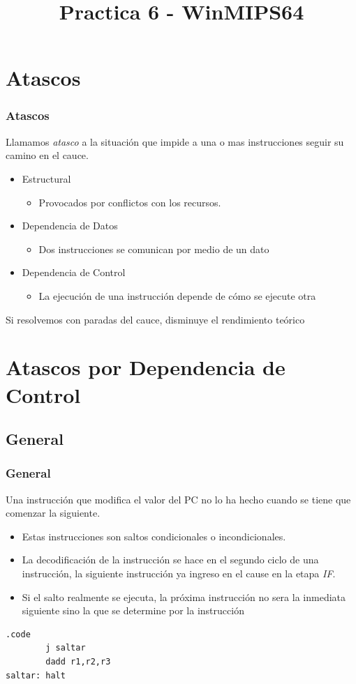 \documentclass{beamer}
\title{Practica 6 - WinMIPS64}
\begin{document}
\section{Atascos}


\begin{frame}
\frametitle{Atascos}
Llamamos \emph{atasco} a la situación que impide a una o mas instrucciones seguir su camino en el cauce.

\begin{itemize}
\item Estructural
\begin{itemize}
\item Provocados por conflictos con los recursos.
\end{itemize}


\item Dependencia de Datos
\begin{itemize}
\item Dos instrucciones se comunican por medio de un dato
\end{itemize}

\item Dependencia de Control
\begin{itemize}
\item La ejecución de una instrucción depende de cómo se ejecute otra
\end{itemize}

\end{itemize}
Si resolvemos con paradas del cauce, disminuye el rendimiento teórico
\end{frame}



\section{Atascos por Dependencia de Control}
\subsection{General}
\begin{frame}[fragile]
\frametitle{General}
Una instrucción que modifica el valor del PC no lo ha hecho cuando se tiene que comenzar la siguiente.
\begin{itemize}
\item Estas instrucciones son saltos condicionales o incondicionales.
\item La decodificación de la instrucción se hace en el segundo ciclo de una instrucción, la siguiente instrucción ya ingreso en el cause en la etapa \emph{IF}.
\item Si el salto realmente se ejecuta, la próxima instrucción no sera la inmediata siguiente sino la que se determine por la instrucción
\end{itemize}
\begin{block}{}
\begin{lstlisting}[basicstyle=\ttfamily,keywordstyle=\color{blue}]
        .code
        j saltar
        dadd r1,r2,r3
saltar: halt
\end{lstlisting}
\end{block}
\end{frame}
\end{document}
